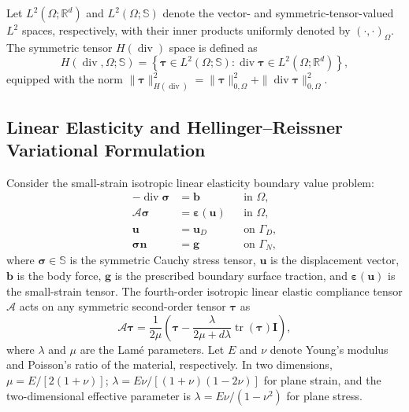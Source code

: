 Let $L^2(\Omega;\mathbb{R}^d)$ and $L^2(\Omega;\mathbb{S})$ denote the vector- and symmetric-tensor-valued $L^2$ spaces, respectively, with their inner products uniformly denoted by $(\cdot,\cdot)_\Omega$. The symmetric tensor $H(\operatorname{div})$ space is defined as
\begin{equation*}
H(\operatorname{div},\Omega;\mathbb{S}) = \left\{ \boldsymbol{\tau} \in L^2(\Omega;\mathbb{S}) : \operatorname{div}\boldsymbol{\tau} \in L^2(\Omega;\mathbb{R}^d) \right\},
\end{equation*}
equipped with the norm $\|\boldsymbol{\tau}\|_{H(\operatorname{div})}^2 = \|\boldsymbol{\tau}\|_{0,\Omega}^2 + \|\operatorname{div}\boldsymbol{\tau}\|_{0,\Omega}^2$.

\subsection{Linear Elasticity and Hellinger--Reissner Variational Formulation}
\label{subsec:hellinger_reissner}

Consider the small-strain isotropic linear elasticity boundary value problem:
\begin{equation}
\label{eq:strong_elasticity}
\begin{aligned}
-\operatorname{div}\boldsymbol{\sigma} &= \boldsymbol{b} && \text{in } \Omega, \\
\mathcal{A}\boldsymbol{\sigma} &= \boldsymbol{\varepsilon}(\boldsymbol{u}) && \text{in } \Omega, \\
\boldsymbol{u} &= \boldsymbol{u}_D && \text{on } \Gamma_D, \\
\boldsymbol{\sigma}\boldsymbol{n} &= \boldsymbol{g} && \text{on } \Gamma_N,
\end{aligned}
\end{equation}
where $\boldsymbol{\sigma} \in \mathbb{S}$ is the symmetric Cauchy stress tensor, $\boldsymbol{u}$ is the displacement vector, $\boldsymbol{b}$ is the body force, $\boldsymbol{g}$ is the prescribed boundary surface traction, and $\boldsymbol{\varepsilon}(\boldsymbol{u})$ is the small-strain tensor. The fourth-order isotropic linear elastic compliance tensor $\mathcal{A}$ acts on any symmetric second-order tensor $\boldsymbol{\tau}$ as
\begin{equation}
\label{eq:compliance_tensor}
\mathcal{A}\boldsymbol{\tau} = \frac{1}{2\mu}\left( \boldsymbol{\tau} - \frac{\lambda}{2\mu + d\lambda} \operatorname{tr}(\boldsymbol{\tau})\boldsymbol{I} \right),
\end{equation}
where $\lambda$ and $\mu$ are the Lam{\'e} parameters. Let $E$ and $\nu$ denote Young's modulus and Poisson's ratio of the material, respectively. In two dimensions, $\mu=E/[2(1+\nu)]$; $\lambda=E\nu/[(1+\nu)(1-2\nu)]$ for plane strain, and the two-dimensional effective parameter is $\lambda=E\nu/(1-\nu^2)$ for plane stress.

